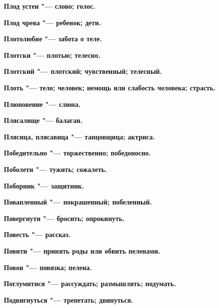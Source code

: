 \begin{multicols}{2}
\bfseries Плод устен\normalfont{} "--- слово; голос. 




\bfseries Плод чрева\normalfont{} "--- ребенок; дети. 




\bfseries Плотолюбие\normalfont{} "--- забота о теле. 




\bfseries Плотски\normalfont{} "--- плотью; телесно. 




\bfseries Плотский\normalfont{} "--- плотский; чувственный; телесный. 




\bfseries Плоть\normalfont{} "--- тело; человек; немощь или слабость человека; страсть. 




\bfseries Плюновение\normalfont{} "--- слюна. 




\bfseries Плясалище\normalfont{} "--- балаган. 




\bfseries Плясица, плясавица\normalfont{} "--- танцовщица; актриса. 




\bfseries Победительно\normalfont{} "--- торжественно; победоносно. 




\bfseries Поболети\normalfont{} "--- тужить; сожалеть. 




\bfseries Поборник\normalfont{} "--- защитник. 




\bfseries Повапленный\normalfont{} "--- покрашенный; побеленный. 




\bfseries Повергнути\normalfont{} "--- бросить; опрокинуть. 




\bfseries Повесть\normalfont{} "--- рассказ. 




\bfseries Повити\normalfont{} "--- принять роды или обвить пеленами. 




\bfseries Повои\normalfont{} "--- повязка; пелена. 




\bfseries Поглумитися\normalfont{} "--- рассуждать; размышлять; подумать. 




\bfseries Подвигнуться\normalfont{} "--- трепетать; двинуться. 





\end{multicols}
